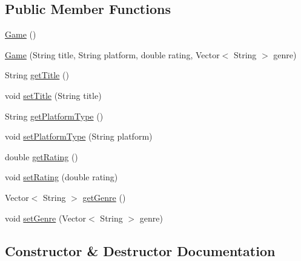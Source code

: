 \subsection*{Public Member Functions}
\begin{DoxyCompactItemize}
\item 
\mbox{\hyperlink{classbridges_1_1data__src__dependent_1_1_game_a9f145dbcbbfbb0432a2cd8631e57173b}{Game}} ()
\item 
\mbox{\hyperlink{classbridges_1_1data__src__dependent_1_1_game_a2bb9d9f659184be2cc9fc68e38433492}{Game}} (String title, String platform, double rating, Vector$<$ String $>$ genre)
\item 
String \mbox{\hyperlink{classbridges_1_1data__src__dependent_1_1_game_af92a6fdd0e852e6cc5d97fb193be4ca9}{get\+Title}} ()
\item 
void \mbox{\hyperlink{classbridges_1_1data__src__dependent_1_1_game_a0c87151b75bc10357aa6829ebfc0cae3}{set\+Title}} (String title)
\item 
String \mbox{\hyperlink{classbridges_1_1data__src__dependent_1_1_game_a1eef8e419c6302ba83ea595491412494}{get\+Platform\+Type}} ()
\item 
void \mbox{\hyperlink{classbridges_1_1data__src__dependent_1_1_game_ab4d51e07186a9228c50210cf661304c7}{set\+Platform\+Type}} (String platform)
\item 
double \mbox{\hyperlink{classbridges_1_1data__src__dependent_1_1_game_a83b444e2c487701b4e9789a6a35ae210}{get\+Rating}} ()
\item 
void \mbox{\hyperlink{classbridges_1_1data__src__dependent_1_1_game_ab59c6ea5ee2721dcca2246e8e287154f}{set\+Rating}} (double rating)
\item 
Vector$<$ String $>$ \mbox{\hyperlink{classbridges_1_1data__src__dependent_1_1_game_ab3c0e46513e71b56a2970ac014b1bf79}{get\+Genre}} ()
\item 
void \mbox{\hyperlink{classbridges_1_1data__src__dependent_1_1_game_ab3c9d9cd9f0acdd7bdc6ea7e1b140868}{set\+Genre}} (Vector$<$ String $>$ genre)
\end{DoxyCompactItemize}


\subsection{Constructor \& Destructor Documentation}
\mbox{\label{classbridges_1_1data__src__dependent_1_1_game_a9f145dbcbbfbb0432a2cd8631e57173b}} 
